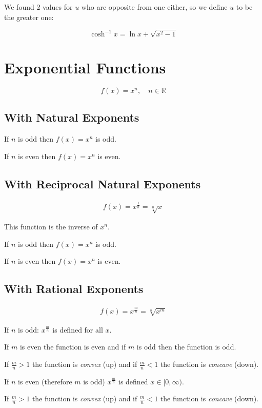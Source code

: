 \documentclass[00_complete]{subfiles}
\begin{document}
We found 2 values for $u$ who are opposite from one either, so we define $u$ to
be the greater one:

$$\boxed{\cosh^{-1}x = \ln{x+\sqrt{x^2-1}}}$$

\section{Exponential Functions}

$$f(x) = x^n, \quad n \in \mathbb{R}$$

\subsection{With Natural Exponents}

If $n$ is odd then $f(x)=x^n$ is odd.

If $n$ is even then $f(x)=x^n$ is even.

\subsection{With Reciprocal Natural Exponents}

$$
\begin{gathered}
    f(x)= x^{\frac{1}{n}} = \sqrt[n]{x}
\end{gathered}
$$

This function is the inverse of $x^n$.

If $n$ is odd then $f(x)=x^n$ is odd.

If $n$ is even then $f(x)=x^n$ is even.

\subsection{With Rational Exponents}

$$
\begin{gathered}
    f(x) = x^{\frac{m}{n}} = \sqrt[n]{x^m}
\end{gathered}
$$

If $n$ is odd: $x^{\frac{m}{n}}$ is defined for all $x$.

If $m$ is even the function is even and if $m$ is odd then the function is odd.

If $\frac{m}{n} > 1$ the function is \emph{convex} (up) and if $\frac{m}{n} < 1$ the
function is \emph{concave} (down).

If $n$ is even (therefore $m$ is odd) $x^{\frac{m}{n}}$ is defined $x \in [0, \infty)$.

If $\frac{m}{n} > 1$ the function is \emph{convex} (up) and if $\frac{m}{n} < 1$ the
function is \emph{concave} (down).
\end{document}
